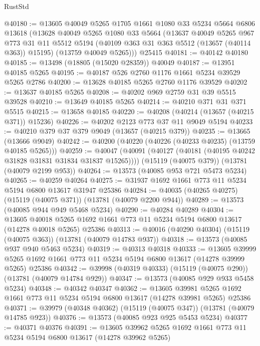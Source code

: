 \begin{lexlean}{RustStd}
\begin{coremodule}
@40180 := @13605
    @40049
    @5265
    @1705
    @1661
    @1080
    @33
    @5234
    @5664
    @6806
    @13618
    (@13628
      @40049
      @5265
      @1080
      @33
      @5664
      (@13637
        @40049
        @5265
        @967
        @773
        @31
        @11
        @5512
        @5194
        (@40109 @363 @31 @363 @5512 (@13657 (@40114 @363)) @15195)
        (@13759 @40049 @5265)))
    @25415
@40181 := @40142 @40180
@40185 := @13498 (@18805 (@15020 @28359)) @40049
@40187 := @13951 @40185 @5265
@40195 := @40187 @526 @2760 @1176 @1661 @5234 @39529 @5265 @2786
@40200 := @13628 @40185 @5265 @2760 @1176 @39529
@40202 := @13637 @40185 @5265
@40208 := @40202 @969 @2759 @31 @39 @5515 @39528
@40210 := @13649 @40185 @5265
@40214 := @40210 @371 @31 @371 @5515
@40215 := @13658 @40185
@40220 := @40208 (@40214 (@13657 (@40215 @371)) @15236)
@40226 := @40202 @2123 @773 @37 @11 @9049 @5194
@40233 := @40210 @379 @37 @379 @9049 (@13657 (@40215 @379))
@40235 := @13665 (@13666 @9049)
@40242 := @40200 (@40220 (@40226 (@40233 @40235) (@13759 @40185 @5265)))
@40259 := @40047
    (@40091 (@40127 (@40181 (@40195 @40242 @31828 @31831 @31834 @31837 @15265))))
    (@15119 (@40075 @379))
    (@13781 (@40079 @2199 @953))
@40264 := @13573 (@40085 @953 @721 @5473 @5234)
@40265 := @40259 @40264
@40275 := @31937 @1692 @1661 @773 @11 @5234 @5194 @6800 @13617 @31947 @25386
@40284 := @40035 (@40265 @40275) (@15119 (@40075 @371)) (@13781 (@40079 @2200 @944))
@40289 := @13573 (@40085 @944 @949 @5468 @5234)
@40290 := @40284 @40289
@40304 := @13605
    @40018
    @5265
    @1692
    @1661
    @773
    @11
    @5234
    @5194
    @6800
    @13617
    (@14278 @40018 @5265)
    @25386
@40313 := @40016 (@40290 @40304) (@15119 (@40075 @363)) (@13781 (@40079 @14783 @937))
@40318 := @13573 (@40085 @937 @940 @5463 @5234)
@40319 := @40313 @40318
@40333 := @13605
    @39999
    @5265
    @1692
    @1661
    @773
    @11
    @5234
    @5194
    @6800
    @13617
    (@14278 @39999 @5265)
    @25386
@40342 := @39998 (@40319 @40333) (@15119 (@40075 @290)) (@13781 (@40079 @14784 @929))
@40347 := @13573 (@40085 @929 @933 @5458 @5234)
@40348 := @40342 @40347
@40362 := @13605
    @39981
    @5265
    @1692
    @1661
    @773
    @11
    @5234
    @5194
    @6800
    @13617
    (@14278 @39981 @5265)
    @25386
@40371 := @39979 (@40348 @40362) (@15119 (@40075 @347)) (@13781 (@40079 @14785 @923))
@40376 := @13573 (@40085 @923 @925 @5453 @5234)
@40377 := @40371 @40376
@40391 := @13605
    @39962
    @5265
    @1692
    @1661
    @773
    @11
    @5234
    @5194
    @6800
    @13617
    (@14278 @39962 @5265)

\end{coremodule}
\end{lexlean}
